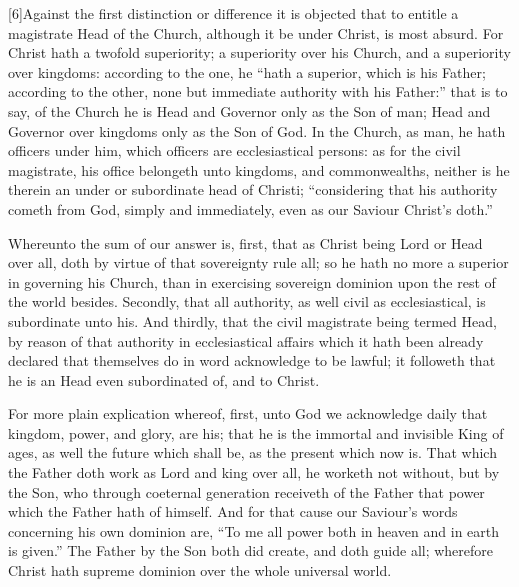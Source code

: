 [6]Against the first distinction or difference it is objected that to entitle a magistrate Head of the Church, although it be under Christ, is most absurd. For Christ hath a twofold superiority; a superiority over his Church, and a superiority over kingdoms: according to the one, he “hath a superior, which is his Father; according to the other, none but immediate authority with his Father:” that is to  say, of the Church he is Head and Governor only as the Son of man; Head and Governor over kingdoms only as the Son of God. In the Church, as man, he hath officers under him, which officers are ecclesiastical persons: as for the civil magistrate, his office belongeth unto kingdoms, and commonwealths, neither is he therein an under or subordinate head of Christi; “considering that his authority cometh from God, simply and immediately, even as our Saviour Christ’s doth.”

Whereunto the sum of our answer is, first, that as Christ being Lord or Head over all, doth by virtue of that sovereignty rule all; so he hath no more a superior in governing his Church, than in exercising sovereign dominion upon the rest of the world besides. Secondly, that all authority, as well civil as ecclesiastical, is subordinate unto his. And thirdly, that the civil magistrate being termed Head, by reason of that authority in ecclesiastical affairs which it hath been already declared that themselves do in word acknowledge to be lawful; it followeth that he is an Head even subordinated of, and to Christ.

For more plain explication whereof, first, unto God we acknowledge daily that kingdom, power, and glory, are his; that he is the immortal and invisible King of ages, as well the future which shall be, as the present which now is. That which the Father doth work as Lord and king over all, he worketh not without, but by the Son, who through coeternal generation receiveth of the Father that power which the Father hath of himself. And for that cause our Saviour’s words concerning his own dominion are, “To me all power both in heaven and in earth is given.” The Father by the Son both did create, and doth guide all; wherefore Christ hath supreme dominion over the whole universal world.

